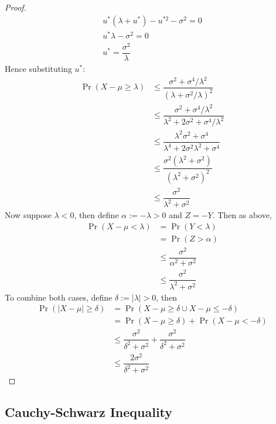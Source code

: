 \documentclass[11pt]{report} %
\begin{document}
\begin{proof}
\begin{gather}
u^{*}\left(\lambda + u^{*}\right) - u^{*2} - \sigma^{2} = 0 \\
u^{*}\lambda - \sigma^{2} = 0 \\
u^{*} = \dfrac{\sigma^{2}}{\lambda}
\end{gather}
Hence substituting $u^{*}$:
\begin{align}
\operatorname{Pr}\left(X - \mu \geq \lambda\right) &\leq \dfrac{\sigma^{2}+\sigma^{4}/\lambda^{2}}{\left(\lambda+\sigma^{2}/\lambda\right)^{2}} \\
&\leq \dfrac{\sigma^{2}+\sigma^{4}/\lambda^{2}}{\lambda^{2}+2\sigma^{2}+\sigma^{4}/\lambda^{2}} \\
&\leq \dfrac{\lambda^{2}\sigma^{2}+\sigma^{4}}{\lambda^{4}+2\sigma^{2}\lambda^{2}+\sigma^{4}} \\
&\leq \dfrac{\sigma^{2}\left(\lambda^{2}+\sigma^{2}\right)}{\left(\lambda^{2}+\sigma^{2}\right)^{2}} \\
&\leq  \dfrac{\sigma^{2}}{\lambda^{2}+\sigma^{2}}
\end{align}
Now suppose $\lambda < 0$, then define $\alpha := -\lambda > 0$ and $Z = -Y$. Then as above,
\begin{align}
\operatorname{Pr}\left(X - \mu < \lambda\right) &= \operatorname{Pr}\left(Y < \lambda\right) \\
&= \operatorname{Pr}\left(Z > \alpha\right) \\
&\leq \dfrac{\sigma^{2}}{\alpha^{2}+\sigma^{2}} \\
&\leq \dfrac{\sigma^{2}}{\lambda^{2}+\sigma^{2}}
\end{align}
To combine both cases, define $\delta := \left|\lambda\right| > 0$, then
\begin{align}
\operatorname{Pr}\left(\left|X - \mu\right| \geq \delta\right) &= \operatorname{Pr}\left(X - \mu \geq \delta \cup X - \mu \leq -\delta\right) \\
&= \operatorname{Pr}\left(X - \mu \geq \delta\right) + \operatorname{Pr}\left(X - \mu < -\delta\right) \\
&\leq \dfrac{\sigma^{2}}{\delta^{2}+\sigma^{2}} + \dfrac{\sigma^{2}}{\delta^{2}+\sigma^{2}} \\
&\leq \dfrac{2\sigma^{2}}{\delta^{2}+\sigma^{2}}
\end{align}
\end{proof}

\subsection{Cauchy-Schwarz Inequality}
\end{document}
